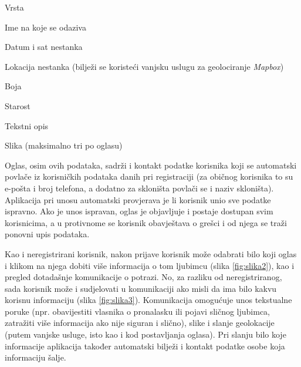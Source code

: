 		\begin{packed_item}
			
			\item  Vrsta
			\item  Ime na koje se odaziva
			\item  Datum i sat nestanka
			\item  Lokacija nestanka (bilježi se koristeći vanjsku uslugu za geolociranje \textit{Mapbox})
			\item  Boja
			\item  Starost
			\item  Tekstni opis
			\item  Slika (maksimalno tri po oglasu)
			
		\end{packed_item}

		Oglas, osim ovih podataka, sadrži i kontakt podatke korisnika koji se automatski povlače iz korisničkih podataka danih pri registraciji (za običnog korisnika to su e-pošta i broj telefona, a dodatno za skloništa povlači se i naziv skloništa). Aplikacija pri unosu automatski provjerava je li korisnik unio sve podatke ispravno. Ako je unos ispravan, oglas je objavljuje i postaje dostupan svim korisnicima, a u protivnome se korisnik obavještava o grešci i od njega se traži ponovni upis podataka.

Kao i neregistrirani korisnik, nakon prijave korisnik može odabrati bilo koji oglas i klikom na njega dobiti više informacija o tom ljubimcu (slika \ref{fig:slika2}), kao i pregled dotadašnje komunikacije o potrazi. No, za razliku od neregistriranog, sada korisnik može i sudjelovati u komunikaciji ako misli da ima bilo kakvu korisnu informaciju (slika \ref{fig:slika3}). Komunikacija omogućuje unos tekstualne poruke (npr. obavijestiti vlasnika o pronalasku ili pojavi sličnog ljubimca, zatražiti više informacija ako nije siguran i slično), slike i slanje geolokacije (putem vanjske usluge, isto kao i kod postavljanja oglasa). Pri slanju bilo koje informacije aplikacija također automatski bilježi i kontakt podatke osobe koja informaciju šalje.


